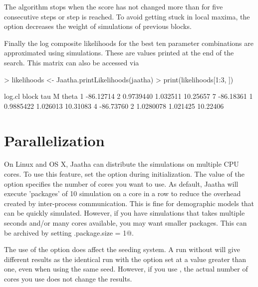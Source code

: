 \documentclass[a4paper]{article}
\begin{document}
The algorithm stops when the score has not changed more than \verb@epsilon@ for five consecutive 
steps or step \verb@nMaxStep@ is reached. To avoid getting stuck in local maxima, 
the \verb@weight@ option decreases the weight of simulations of previous blocks.

Finally the log composite likelihoods for the best ten parameter combinations are 
approximated using \verb@nFinalSim@ simulations. These are values printed at the 
end of the search. This matrix can also be accessed via

\begin{Schunk}
\begin{Sinput}
> likelihoods <- Jaatha.printLikelihoods(jaatha)
> print(likelihoods[1:3, ])
\end{Sinput}
\begin{Soutput}
     log.cl block       tau        M    theta
1 -86.12714     2 0.9739440 1.032511 10.25657
7 -86.18361     1 0.9885422 1.026013 10.31083
4 -86.73760     2 1.0280078 1.021425 10.22406
\end{Soutput}
\end{Schunk}


\section{Parallelization}
On Linux and OS X, Jaatha can distribute the simulations on multiple CPU cores.
To use this feature, set the \verb@cores@ option during initialization. The
value of the option specifies the number of cores you want to use. As default,
Jaatha will execute 'packages' of 10 simulation on a core in a row to reduce the
overhead created by inter-process communication. This is fine for demographic
models that can be quickly simulated. However, if you have simulations that takes
multiple seconds and/or many cores available, you may want smaller packages.
This can be archived by setting \verb@sim.package.size = 1@.

The use of the \verb@cores@ option does affect the seeding system. A run without
\verb@cores@ will give different results as the identical run with the option
set at a value greater than one, even when using the same seed. However, if you
use \verb@cores@, the actual number of cores you use does not change the
results.



\end{document}
